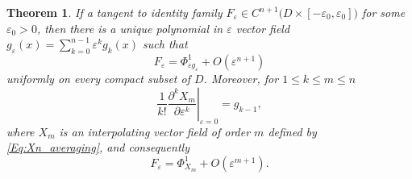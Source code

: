 \documentclass[a4paper,12pt]{article}
\newtheorem{thm}{Theorem}
\begin{document}
\begin{thm} \label{Thm:formal}
If a tangent to identity family $F_\varepsilon\in C^{n+1}\bigl(D\times [-\varepsilon_0,\varepsilon_0]\bigr)$
for some $\varepsilon_0>0$,
then there is a unique polynomial in $\varepsilon$ vector field
\(
g_\varepsilon(x)=\sum_{k=0}^{n-1}\varepsilon^k g_k(x)
\)
such that 
\[
F_\varepsilon=\Phi^1_{\varepsilon g_\varepsilon}+O(\varepsilon^{n+1})
\]
uniformly on every compact subset of $D$. Moreover, for   $1\le k\le m \le n$
\begin{equation}\label{Eq:g_k}
\frac{1}{k!}\left.\frac{\partial^k X_m}{\partial \varepsilon^{k}}\right|_{\varepsilon=0}=g_{k-1},    
\end{equation}
where $X_m$ is an interpolating vector field of order $m$ defined by \eqref{Eq:Xn_averaging},
and consequently
\begin{equation}\label{Eq:errorbound}
F_\varepsilon=\Phi^1_{X_m}+O(\varepsilon^{m+1}).
\end{equation}
\end{thm}
\end{document}
